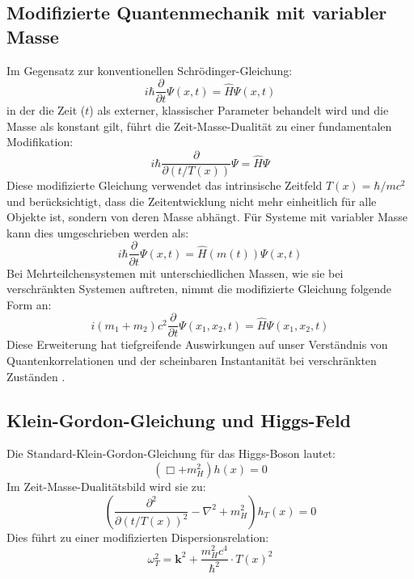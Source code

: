 \documentclass[12pt,a4paper]{article}
\newcommand{\Tfield}{T(x)}
\begin{document}
	\subsection{Modifizierte Quantenmechanik mit variabler Masse}
	Im Gegensatz zur konventionellen Schrödinger-Gleichung:
	\begin{equation}
		i\hbar \frac{\partial}{\partial t}\Psi(x,t) = \hat{H}\Psi(x,t)
	\end{equation}
	in der die Zeit (\(t\)) als externer, klassischer Parameter behandelt wird und die Masse als konstant gilt, führt die Zeit-Masse-Dualität zu einer fundamentalen Modifikation:
	\begin{equation}
		i\hbar \frac{\partial}{\partial (t/\Tfield)}\Psi = \hat{H}\Psi
	\end{equation}
	Diese modifizierte Gleichung verwendet das intrinsische Zeitfeld \(\Tfield = \hbar/mc^2\) und berücksichtigt, dass die Zeitentwicklung nicht mehr einheitlich für alle Objekte ist, sondern von deren Masse abhängt. Für Systeme mit variabler Masse kann dies umgeschrieben werden als:
	\begin{equation}
		i\hbar \frac{\partial}{\partial t}\Psi(x,t) = \hat{H}(m(t))\Psi(x,t)
	\end{equation}
	Bei Mehrteilchensystemen mit unterschiedlichen Massen, wie sie bei verschränkten Systemen auftreten, nimmt die modifizierte Gleichung folgende Form an:
	\begin{equation}
		i (m_1 + m_2) c^2 \frac{\partial}{\partial t} \Psi(x_1, x_2, t) = \hat{H} \Psi(x_1, x_2, t)
	\end{equation}
	Diese Erweiterung hat tiefgreifende Auswirkungen auf unser Verständnis von Quantenkorrelationen und der scheinbaren Instantanität bei verschränkten Zuständen \cite{Pascher2024}.
	
	\subsection{Klein-Gordon-Gleichung und Higgs-Feld}
	Die Standard-Klein-Gordon-Gleichung für das Higgs-Boson lautet:
	\begin{equation}
		(\Box + m_H^2) h(x) = 0
	\end{equation}
	Im Zeit-Masse-Dualitätsbild wird sie zu:
	\begin{equation}
		\left(\frac{\partial^2}{\partial(t/\Tfield)^2} - \nabla^2 + m_H^2\right) h_T(x) = 0
	\end{equation}
	Dies führt zu einer modifizierten Dispersionsrelation:
	\begin{equation}
		\omega_T^2 = \mathbf{k}^2 + \frac{m_H^2 c^4}{\hbar^2} \cdot T(x)^2
	\end{equation}
	
\end{document}
